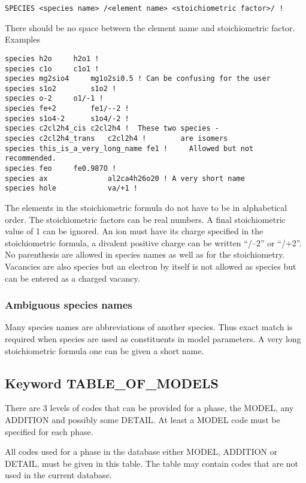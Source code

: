 \documentclass[12pt]{article}
\begin{document}
\begin{verbatim}
SPECIES <species name> /<element name> <stoichiometric factor>/ !
\end{verbatim}

There should be no space between the element name and stoichiometric
factor.  Examples

\begin{verbatim}
species h2o		h2o1 !
species c1o		c1o1 !
species mg2sio4		mg1o2si0.5 ! Can be confusing for the user
species s1o2		s1o2 !
species o-2		o1/-1 !
species fe+2		fe1/--2 !
species s1o4-2		s1o4/-2 !
species c2cl2h4_cis	c2cl2h4 !  These two species -
species c2cl2h4_trans	c2cl2h4 !        are isomers
species this_is_a_very_long_name fe1 !     Allowed but not recommended.
species feo		fe0.987O !
species ax              al2ca4h26o20 ! A very short name
species hole            va/+1 !
\end{verbatim}

The elements in the stoichiometric formula do not have to be in
alphabetical order.  The stoichiometric factors can be real numbers.
A final stoichiometric value of 1 can be ignored.  An ion must have
its charge specified in the stoichiometric formula, a divalent
positive charge can be written ``/--2'' or ``/+2''.  No parenthesis
are allowed in species names as well as for the stoichiometry.
Vacancies are also species but an electron by itself is not allowed as
species but can be entered as a charged vacancy.

\subsubsection{Ambiguous species names}\label{sec:spnames}

Many species names are abbreviations of another species.  Thus exact
match is required when species are used as constituents in model
parameters.  A very long stoichiometric formula one can be given a
short name.

\subsection{Keyword TABLE\_OF\_MODELS}

There are 3 levels of codes that can be provided for a phase, the
MODEL, any ADDITION and possibly some DETAIL.  At least a MODEL code
must be specified for each phase.

All codes used for a phase in the database either MODEL, ADDITION or
DETAIL, must be given in this table.  The table may contain codes
that are not used in the current database.
\end{document}
